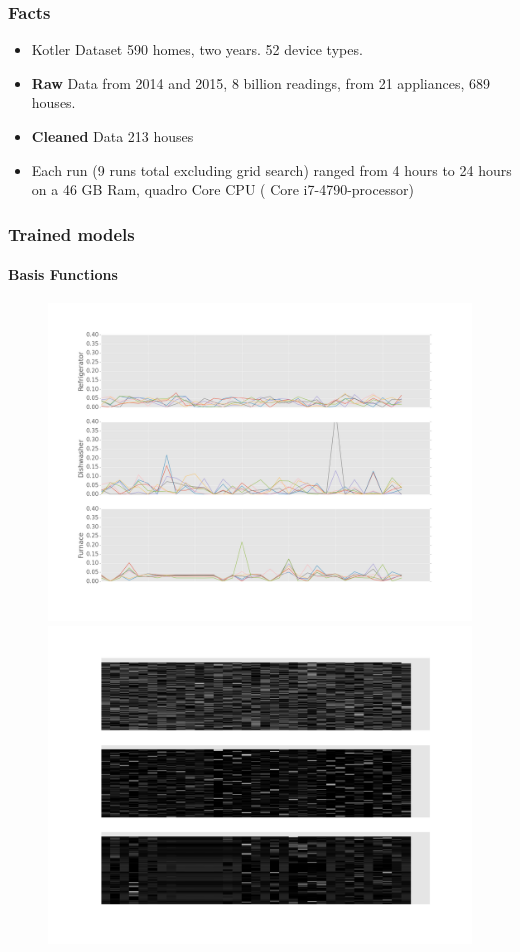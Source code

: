 \documentclass{beamer}              %
\begin{document}
\begin{frame}
\frametitle{Facts}
\begin{itemize}
	\item{Kotler Dataset 590 homes, two years. 52 device types.}
	\item {\textbf{Raw} Data from 2014 and 2015, 8 billion readings, from 21 appliances, 689 houses.}
	\item{\textbf{Cleaned} Data 213 houses}
	\item{Each run (9 runs total excluding grid search) ranged from 4 hours to 24 hours on a 46 GB Ram, quadro Core CPU ( Core i7-4790-processor)}
\end{itemize}
\end{frame}


\begin{frame}
	\frametitle{Trained models}
	\framesubtitle{Basis Functions}
	\begin{figure}[H]
		\centering
		\begin{minipage}{.5\textwidth}
			\centering
			\includegraphics[scale=0.16]{./figures/app_basis_transparent.png}
		\end{minipage}%
		\begin{minipage}{.5\textwidth}
			\centering
			\includegraphics[scale=0.16]{./figures/basis_transparent.png}

\end{minipage}
\end{figure}
\end{frame}
\end{document}
